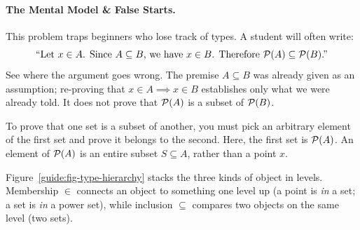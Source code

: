 \paragraph{The Mental Model \& False Starts.}
This problem traps beginners who lose track of types. A student will often write:
\[
\text{``Let $x \in A$. Since $A \subseteq B$, we have $x \in B$. Therefore $\mathcal{P}(A) \subseteq \mathcal{P}(B)$.''}
\]
See where the argument goes wrong. The premise $A \subseteq B$ was already given as an assumption; re-proving that $x \in A \implies x \in B$ establishes only what we were already told. It does not prove that $\mathcal{P}(A)$ is a subset of $\mathcal{P}(B)$. 

To prove that one set is a subset of another, you must pick an arbitrary element of the first set and prove it belongs to the second. Here, the first set is $\mathcal{P}(A)$. An element of $\mathcal{P}(A)$ is an entire subset $S \subseteq A$, rather than a point $x$.

Figure~\ref{guide:fig-type-hierarchy} stacks the three kinds of object in levels. Membership $\in$ connects an object to something one level up (a point is \emph{in} a set; a set is \emph{in} a power set), while inclusion $\subseteq$ compares two objects on the same level (two sets).

